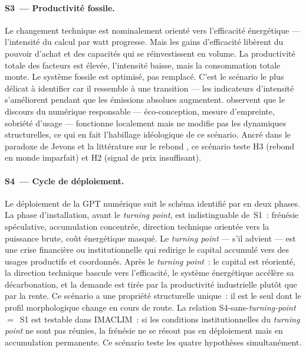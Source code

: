 \paragraph{S3~--- Productivit\'e fossile.}
Le changement technique est nominalement orient\'e vers l'efficacit\'e \'energ\'etique --- l'intensit\'e du calcul par watt progresse. Mais les gains d'efficacit\'e lib\`erent du pouvoir d'achat et des capacit\'es qui se r\'einvestissent en volume. La productivit\'e totale des facteurs est \'elev\'ee, l'intensit\'e baisse, mais la consommation totale monte. Le syst\`eme fossile est optimis\'e, pas remplac\'e. C'est le sc\'enario le plus d\'elicat \`a identifier car il ressemble \`a une transition --- les indicateurs d'intensit\'e s'am\'eliorent pendant que les \'emissions absolues augmentent. \textcite{deron_par_2025} observent que le discours du \og num\'erique responsable\fg{} --- \'eco-conception, mesure d'empreinte, sobri\'et\'e d'usage --- fonctionne localement mais ne modifie pas les dynamiques structurelles, ce qui en fait l'habillage id\'eologique de ce sc\'enario. Ancr\'e dans le paradoxe de Jevons et la litt\'erature sur le rebond \parencite{brockway_energy_2021}, ce sc\'enario teste H3 (rebond en monde imparfait) et H2 (signal de prix insuffisant).

\paragraph{S4~--- Cycle de d\'eploiement.}
Le d\'eploiement de la GPT num\'erique suit le sch\'ema identifi\'e par \textcite{perez_technological_2002} en deux phases. La phase d'installation, avant le \emph{turning point}, est indistinguable de~S1~: fr\'en\'esie sp\'eculative, accumulation concentr\'ee, direction technique orient\'ee vers la puissance brute, co\^ut \'energ\'etique masqu\'e. Le \emph{turning point} --- s'il advient --- est une crise financi\`ere ou institutionnelle qui redirige le capital accumul\'e vers des usages productifs et coordonn\'es. Apr\`es le \emph{turning point}~: le capital est r\'eorient\'e, la direction technique bascule vers l'efficacit\'e, le syst\`eme \'energ\'etique acc\'el\`ere sa d\'ecarbonation, et la demande est tir\'ee par la productivit\'e industrielle plut\^ot que par la rente. Ce sc\'enario a une propri\'et\'e structurelle unique~: il est le seul dont le profil morphologique change en cours de route. La relation S4-sans-\emph{turning-point}~$=$~S1 est testable dans IMACLIM~: si les conditions institutionnelles du \emph{turning point} ne sont pas r\'eunies, la fr\'en\'esie ne se r\'esout pas en d\'eploiement mais en accumulation permanente. Ce sc\'enario teste les quatre hypoth\`eses simultan\'ement.

